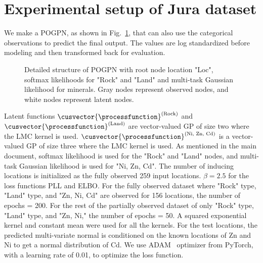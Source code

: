 \appendix
\section{Experimental setup of Jura dataset}
We make a POGPN, as shown in Fig.~\ref{fig:jura_dag_appendix}, that can also use the categorical observations to predict the final output. The values are log standardized before modeling and then transformed back for evaluation.

\begin{figure}[h]
      \centering
      
      \caption{Detailed structure of POGPN with root node location "Loc", softmax likelihoods for "Rock" and "Land" and multi-task Gaussian likelihood for minerals. Gray nodes represent observed nodes, and white nodes represent latent nodes.}
      \vspace{-1em}
      \label{fig:jura_dag_appendix}
\end{figure}

Latent functions $\cusvector{\processfunction}^{(\text{Rock})}$ and $\cusvector{\processfunction}^{(\text{Land})}$ are vector-valued GP of size two where the LMC kernel is used. $\cusvector{\processfunction}^{(\text{Ni, Zn, Cd})}$ is a vector-valued GP of size three where the LMC kernel is used. As mentioned in the main document, softmax likelihood is used for the "Rock" and "Land" nodes, and multi-task Gaussian likelihood is used for "Ni, Zn, Cd". The number of inducing locations is initialized as the fully observed 259 input locations. $\beta=2.5$ for the loss functions PLL and ELBO. For the fully observed dataset where "Rock" type, "Land" type, and "Zn, Ni, Cd" are observed for 156 locations, the number of epochs = 200. For the rest of the partially observed dataset of only "Rock" type, "Land" type, and "Zn, Ni," the number of epochs = 50. A squared exponential kernel and constant mean were used for all the kernels. For the test locations, the predicted multi-variate normal is conditioned on the known locations of Zn and Ni to get a normal distribution of Cd. We use ADAM~\citep{kingma2014adam} optimizer from PyTorch, with a learning rate of 0.01, to optimize the loss function.

